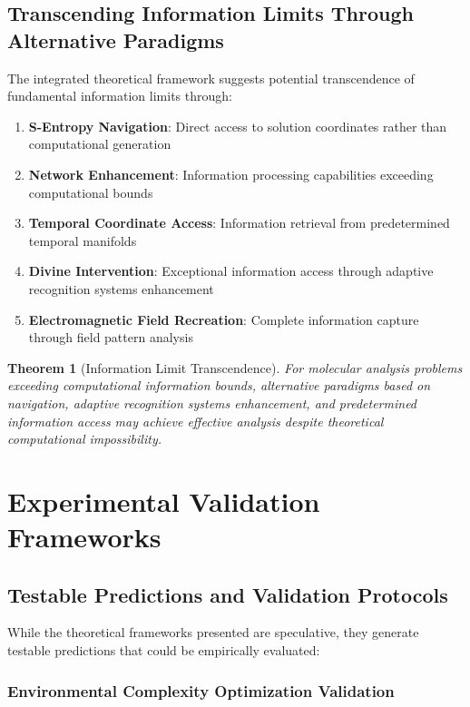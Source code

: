 \documentclass[11pt,a4paper]{article}
\newtheorem{theorem}{Theorem}[section]
\theoremstyle{remark}
\begin{document}
\subsection{Transcending Information Limits Through Alternative Paradigms}

The integrated theoretical framework suggests potential transcendence of fundamental information limits through:

\begin{enumerate}
\item \textbf{S-Entropy Navigation}: Direct access to solution coordinates rather than computational generation
\item \textbf{Network Enhancement}: Information processing capabilities exceeding computational bounds
\item \textbf{Temporal Coordinate Access}: Information retrieval from predetermined temporal manifolds
\item \textbf{Divine Intervention}: Exceptional information access through adaptive recognition systems enhancement
\item \textbf{Electromagnetic Field Recreation}: Complete information capture through field pattern analysis
\end{enumerate}

\begin{theorem}[Information Limit Transcendence]
For molecular analysis problems exceeding computational information bounds, alternative paradigms based on navigation, adaptive recognition systems enhancement, and predetermined information access may achieve effective analysis despite theoretical computational impossibility.
\end{theorem}

\section{Experimental Validation Frameworks}

\subsection{Testable Predictions and Validation Protocols}

While the theoretical frameworks presented are speculative, they generate testable predictions that could be empirically evaluated:

\subsubsection{Environmental Complexity Optimization Validation}
\end{document}
